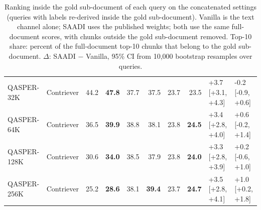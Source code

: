 \begin{table}[t]
\begin{tabular}{llrrrrrrll}
QASPER-32K & Contriever & 44.2 & \textbf{47.8} & 37.7 & 37.5 & 23.7 & 23.5 & +3.7 [+3.1, +4.3] & -0.2 [-0.9, +0.6] \\
QASPER-64K & Contriever & 36.5 & \textbf{39.9} & 38.8 & 38.1 & 23.8 & \textbf{24.5} & +3.4 [+2.8, +4.0] & +0.6 [-0.2, +1.4] \\
QASPER-128K & Contriever & 30.6 & \textbf{34.0} & 38.5 & 37.9 & 23.8 & \textbf{24.0} & +3.3 [+2.8, +3.9] & +0.2 [-0.6, +1.0] \\
QASPER-256K & Contriever & 25.2 & \textbf{28.6} & 38.1 & \textbf{39.4} & 23.7 & \textbf{24.7} & +3.5 [+2.8, +4.1] & +1.0 [+0.2, +1.8] \\
\bottomrule
\end{tabular}
\caption{Ranking inside the gold sub-document of each query on the concatenated settings (queries with labels re-derived inside the gold sub-document). Vanilla is the text channel alone; SAADI uses the published weights; both use the same full-document scores, with chunks outside the gold sub-document removed. Top-10 share: percent of the full-document top-10 chunks that belong to the gold sub-document. $\Delta$: SAADI $-$ Vanilla, 95\% CI from 10{,}000 bootstrap resamples over queries.}
\label{tab:subdoc-control}
\end{table}

